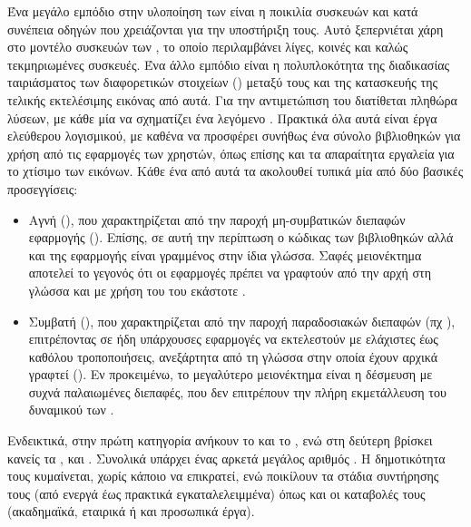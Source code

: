 Ένα μεγάλο εμπόδιο στην υλοποίηση των  είναι η ποικιλία συσκευών
και κατά συνέπεια οδηγών που χρειάζονται για την υποστήριξη τους. Αυτό
ξεπερνιέται χάρη στο μοντέλο συσκευών των , το οποίο
περιλαμβάνει λίγες, κοινές και καλώς τεκμηριωμένες συσκευές. Ένα άλλο εμπόδιο
είναι η πολυπλοκότητα της διαδικασίας ταιριάσματος των διαφορετικών στοιχείων
() μεταξύ τους και της κατασκευής της τελικής εκτελέσιμης εικόνας
από αυτά. Για την αντιμετώπιση του διατίθεται πληθώρα λύσεων, με κάθε μία
να σχηματίζει ένα λεγόμενο . Πρακτικά όλα αυτά είναι
έργα ελεύθερου λογισμικού, με καθένα να προσφέρει συνήθως ένα σύνολο
βιβλιοθηκών για χρήση από τις εφαρμογές των χρηστών, όπως επίσης και τα
απαραίτητα εργαλεία για το χτίσιμο των εικόνων. Κάθε ένα από αυτά τα
 ακολουθεί τυπικά μία από δύο βασικές προσεγγίσεις:
\begin{itemize}
    \item Αγνή (), που χαρακτηρίζεται από την παροχή
        μη-συμβατικών διεπαφών εφαρμογής (). Επίσης, σε αυτή την
        περίπτωση ο κώδικας των βιβλιοθηκών αλλά και της εφαρμογής είναι
        γραμμένος στην ίδια γλώσσα. Σαφές μειονέκτημα αποτελεί το γεγονός ότι
        οι εφαρμογές πρέπει να γραφτούν από την αρχή στη γλώσσα και με χρήση του
         του εκάστοτε .
    \item Συμβατή (), που χαρακτηρίζεται από την παροχή
        παραδοσιακών διεπαφών (πχ ), επιτρέποντας σε ήδη υπάρχουσες
        εφαρμογές να εκτελεστούν με ελάχιστες έως καθόλου τροποποιήσεις,
        ανεξάρτητα από τη γλώσσα στην οποία έχουν αρχικά γραφτεί (). Εν προκειμένω, το μεγαλύτερο μειονέκτημα είναι η
        δέσμευση με συχνά παλαιωμένες διεπαφές, που δεν επιτρέπουν την πλήρη
        εκμετάλλευση του δυναμικού των .
\end{itemize}
Ενδεικτικά, στην πρώτη κατηγορία ανήκουν το  \cite{mirageos} και το
 \cite{includeos}, ενώ στη δεύτερη βρίσκει κανείς τα 
\cite{rumprun}, \osv{} \cite{osv} και  \cite{hermitux}. Συνολικά
υπάρχει ένας αρκετά μεγάλος αριθμός . Η δημοτικότητα
τους κυμαίνεται, χωρίς κάποιο να επικρατεί, ενώ ποικίλουν τα στάδια συντήρησης
τους (από ενεργά έως πρακτικά εγκαταλελειμμένα) όπως και οι καταβολές τους
(ακαδημαϊκά, εταιρικά ή και προσωπικά έργα).


